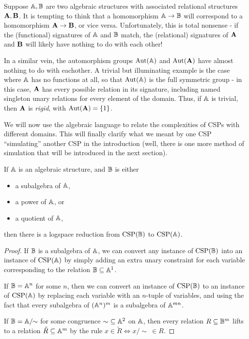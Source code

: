 \documentclass[letterpaper,11pt]{article}
\DeclareMathOperator{\CSP}{CSP}
\DeclareMathOperator{\Aut}{Aut}
\begin{document}
\begin{rem} Suppose $\mathbb{A}, \mathbb{B}$ are two algebraic structures with associated relational structures $\mathbf{A}, \mathbf{B}$. It is tempting to think that a homomorphism $\mathbb{A} \rightarrow \mathbb{B}$ will correspond to a homomorphism $\mathbf{A} \rightarrow \mathbf{B}$, or vice versa. Unfortunately, this is total nonsense - if the (functional) signatures of $\mathbb{A}$ and $\mathbb{B}$ match, the (relational) signatures of $\mathbf{A}$ and $\mathbf{B}$ will likely have nothing to do with each other!

In a similar vein, the automorphism groups $\Aut(\bA)$ and $\Aut(\fA)$ have almost nothing to do with eachother. A trivial but illuminating example is the case where $\mathbb{A}$ has no functions at all, so that $\Aut(\bA)$ is the full symmetric group - in this case, $\mathbf{A}$ has every possible relation in its signature, including named singleton unary relations for every element of the domain. Thus, if $\mathbb{A}$ is trivial, then $\mathbf{A}$ is \emph{rigid}, with $\Aut(\fA) = \{1\}$.
\end{rem}

We will now use the algebraic language to relate the complexities of CSPs with different domains. This will finally clarify what we meant by one CSP ``simulating'' another CSP in the introduction (well, there is one more method of simulation that will be introduced in the next section).

\begin{thm} If $\mathbb{A}$ is an algebraic structure, and $\mathbb{B}$ is either
\begin{itemize}
\item a subalgebra of $\mathbb{A}$,

\item a power of $\mathbb{A}$, or

\item a quotient of $\mathbb{A}$,
\end{itemize}
then there is a logspace reduction from $\CSP(\bB)$ to $\CSP(\bA)$.
\end{thm}
\begin{proof} If $\mathbb{B}$ is a subalgebra of $\mathbb{A}$, we can convert any instance of $\CSP(\bB)$ into an instance of $\CSP(\bA)$ by simply adding an extra unary constraint for each variable corresponding to the relation $\mathbb{B} \subseteq \mathbb{A}^1$.

If $\mathbb{B} = \mathbb{A}^n$ for some $n$, then we can convert an instance of $\CSP(\bB)$ to an instance of $\CSP(\bA)$ by replacing each variable with an $n$-tuple of variables, and using the fact that every subalgebra of $(\mathbb{A}^n)^m$ is a subalgebra of $\mathbb{A}^{mn}$.

If $\mathbb{B} = \mathbb{A}/\!\!\sim$ for some congruence $\sim\ \subseteq \mathbb{A}^2$ on $\mathbb{A}$, then every relation $R \subseteq \mathbb{B}^m$ lifts to a relation $\tilde{R} \subseteq \mathbb{A}^m$ by the rule $x \in \tilde{R} \iff x/\!\!\sim\ \in R$.
\end{proof}
\end{document}
